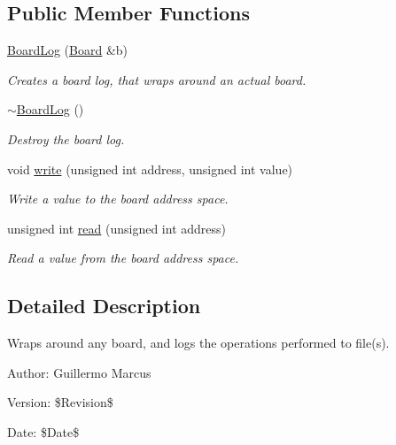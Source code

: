 \subsection*{Public Member Functions}
\begin{CompactItemize}
\item 
\hyperlink{classmprace_1_1BoardLog_a0}{Board\-Log} (\hyperlink{classmprace_1_1Board}{Board} \&b)
\begin{CompactList}\small\item\em Creates a board log, that wraps around an actual board. \item\end{CompactList}\item 
\hyperlink{classmprace_1_1BoardLog_a1}{$\sim$Board\-Log} ()
\begin{CompactList}\small\item\em Destroy the board log. \item\end{CompactList}\item 
void \hyperlink{classmprace_1_1BoardLog_a2}{write} (unsigned int address, unsigned int value)
\begin{CompactList}\small\item\em Write a value to the board address space. \item\end{CompactList}\item 
unsigned int \hyperlink{classmprace_1_1BoardLog_a3}{read} (unsigned int address)
\begin{CompactList}\small\item\em Read a value from the board address space. \item\end{CompactList}\end{CompactItemize}


\subsection{Detailed Description}
Wraps around any board, and logs the operations performed to file(s). 

\begin{Desc}
\item[Author:]Guillermo Marcus \end{Desc}
\begin{Desc}
\item[Version:]\$Revision\$ \end{Desc}
\begin{Desc}
\item[Date:]\$Date\$ \end{Desc}




